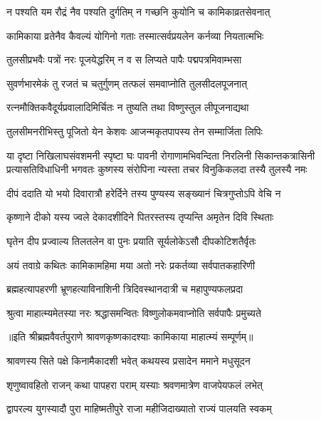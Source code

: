 \twolineshloka
{न पश्यति यम रौद्रं नैव पश्यति दुर्गतिम्}
{न गच्छनि कुयोनि च कामिकाव्रतसेवनात्} %

\twolineshloka
{कामिकाया व्रतेनैव कैवल्यं योगिनो गताः}
{तस्मात्सर्वप्रयलेन कर्नव्या नियतात्मभिः} %

\twolineshloka
{तुलसीप्रभवैः पत्रों नरः पूजयेद्धरिम्}
{न व स लिप्यते पापैः पद्मपत्रमिवाम्भसा} %

\twolineshloka
{सुवर्णभारमेकं तु रजतं च चतुर्गुणम्}
{तत्फलं समवाप्नोति तुलसीदलपूजनात्} %

\twolineshloka
{रत्नमौक्तिकवैदूर्यप्रवालादिमिर्चितः}
{न तुष्यति तथा विष्णुस्तुल लीपूजनाद्यथा} %

\twolineshloka
{तुलसीमनरीभिस्तु पूजितो येन केशवः}
{आजन्मकृतपापस्य तेन सम्मार्जिता लिपिः} %

\fourlineindentedshloka
{या दृष्टा निखिलाघसंवशमनी स्पृष्टा घः पावनी}
{रोगाणामभिवन्दिता निरलिनी सिकान्तकत्रासिनी}
{प्रत्यासतिविधाधिनी भगवतः कुष्गस्य संरोपिना}
{न्यस्ता तचर विनुकिकलदा तस्यै तुलस्यै नमः} %

\twolineshloka
{दीपं ददाति यो भयो दिवारात्रौ हरेर्दिने}
{तस्य पुण्यस्य सङ्ख्यानं चित्रगुप्तोऽपि वेचि न} %

\twolineshloka
{कृष्णाने दीको यस्य ज्वले देकादशीदिने}
{पितरस्तस्य तृप्यन्ति अमृतेन दिवि स्थिताः} %

\twolineshloka
{घृतेन दीप प्रज्वाल्य तिलतलेन वा पुनः}
{प्रयाति सूर्यलोकेऽसौ दीपकोटिशतैर्वृतः} %

\twolineshloka
{अयं तवाग्रे कथितः कामिकामहिमा मया}
{अतो नरेः प्रकर्तव्या सर्वपातकहारिणी} %

\twolineshloka
{ब्रह्महत्यापहरणी भ्रूणहत्याविनाशिनी}
{त्रिदिवस्थानदात्री च महापुण्यफलप्रदा} %

\twolineshloka
{श्रुत्वा माहात्म्यमेतस्या नरः श्रद्धासमन्वितः}
{विष्णुलोकमवाप्नोति सर्वपापैः प्रमुच्यते} %

॥इति श्रीब्रह्मवैवर्तपुराणे श्रावणकृष्णकादश्याः कामिकाया माहात्म्यं सम्पूर्णम्॥



\twolineshloka
{श्रावणस्य सिते पक्षे किनामैकादशी भवेत्}
{कथयस्व प्रसादेन ममाने मधुसूदन} %


\twolineshloka
{शृणुष्वावहितो राजन् कथा पापहरा पराम्}
{यस्याः श्रवणमात्रेण वाजपेयफलं लभेत्} %

\twolineshloka
{द्वापरल्य युगस्यादौ पुरा माहिष्मतीपुरे}
{राजा महीजिदाख्यातो राज्यं पालयति स्वकम्} %

